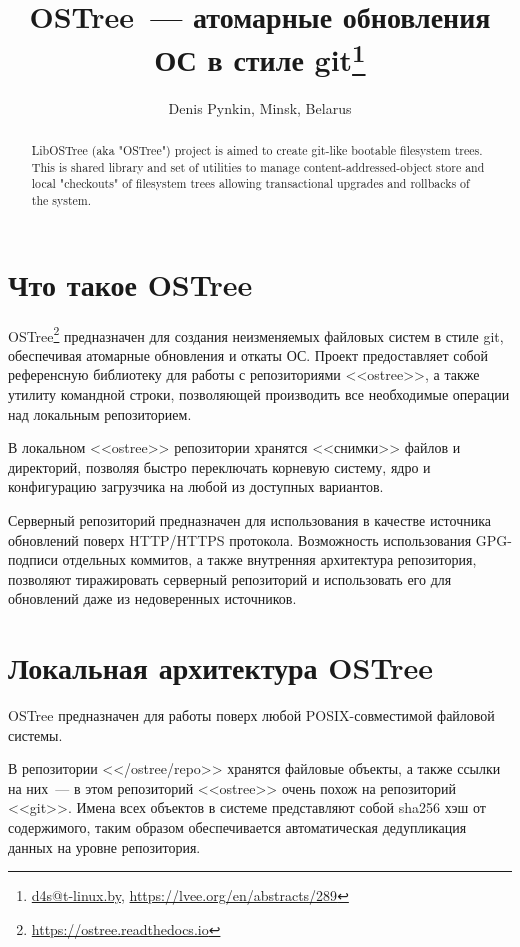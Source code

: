\documentclass[10pt, a5paper]{article}
\begin{document}
\title{OSTree~--- атомарные обновления ОС в стиле git\footnote{\url{d4s@t-linux.by}, \url{https://lvee.org/en/abstracts/289}}}
\author{Denis Pynkin, Minsk, Belarus}
\maketitle
\begin{abstract}
LibOSTree (aka "OSTree") project is aimed to create git-like bootable filesystem trees.
This is shared library and set of utilities to manage content-addressed-object store
and local "checkouts" of filesystem trees allowing transactional upgrades and rollbacks of the system.
\end{abstract}

\section*{Что такое OSTree}

OSTree\footnote{\url{https://ostree.readthedocs.io}} предназначен для создания неизменяемых файловых систем в стиле git, обеспечивая атомарные обновления и откаты ОС. Проект предоставляет собой референсную библиотеку для работы с репозиториями <<ostree>>, а также утилиту командной строки, позволяющей производить все необходимые операции над локальным репозиторием.

В локальном <<ostree>> репозитории хранятся <<снимки>> файлов и директорий, позволяя быстро переключать корневую систему, ядро и конфигурацию загрузчика на любой из доступных вариантов.

Серверный репозиторий предназначен для использования в качестве источника обновлений поверх HTTP/HTTPS протокола. Возможность использования GPG-подписи отдельных коммитов, а также внутренняя архитектура репозитория, позволяют тиражировать серверный репозиторий и использовать его для обновлений даже из недоверенных источников.

\section*{Локальная архитектура OSTree}

OSTree предназначен для работы поверх любой POSIX-\linebreak совместимой файловой системы.

В репозитории <</ostree/repo>> хранятся файловые объекты, а также ссылки на них~--- в этом репозиторий <<ostree>> очень похож на репозиторий <<git>>. Имена всех объектов в системе представляют собой sha256 хэш от содержимого, таким образом обеспечивается автоматическая дедупликация данных на уровне репозитория.
\end{document}
